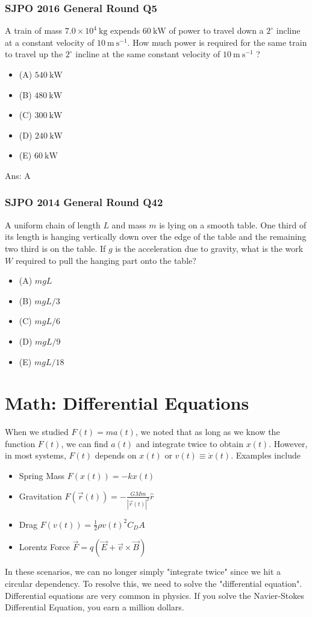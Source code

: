 \documentclass{article}
\begin{document}
\subsubsection{SJPO 2016 General Round Q5}
A train of mass $7.0 \times 10^4 \mathrm{~kg}$ expends $60 \mathrm{~kW}$ of power to travel down a $2^{\circ}$ incline at a constant velocity of $10 \mathrm{~m} \mathrm{~s}^{-1}$. How much power is required for the same train to travel up the $2^{\circ}$ incline at the same constant velocity of $10 \mathrm{~m} \mathrm{~s}^{-1}$ ?
\begin{itemize}
\item[] (A) $540 \mathrm{~kW}$
\item[] (B) $480 \mathrm{~kW}$
\item[] (C) $300 \mathrm{~kW}$
\item[] (D) $240 \mathrm{~kW}$
\item[] (E) $60 \mathrm{~kW}$
\end{itemize}
Ans:  \ifpaper A \fi

\subsubsection{SJPO 2014 General Round Q42}
A uniform chain of length $L$ and mass $m$ is lying on a smooth table. One third of its length is hanging vertically down over the edge of the table and the remaining two third is on the table. If $g$ is the acceleration due to gravity, what is the work $W$ required to pull the hanging part onto the table?
\begin{itemize}
\item[] (A) $m g L$
\item[] (B) $m g L / 3$
\item[] (C) $m g L / 6$
\item[] (D) $m g L / 9$
\item[] (E) $m g L / 18$
\end{itemize}

\section{Math: Differential Equations}
When we studied $F(t)=ma(t)$, we noted that as long as we know the function $F(t)$, we can find $a(t)$ and integrate twice to obtain $x(t)$. However, in most systems, $F(t)$ depends on $x(t)$ or $v(t) \equiv \dot{x}(t)$. Examples include 
\begin{itemize}
    \item Spring Mass $F(x(t)) = -kx(t)$
    \item Gravitation $F(\vec{r}(t)) = -\frac{GMm}{|\vec{r}(t)|^2} \hat{r}$
    \item Drag $F(v(t)) = \frac{1}{2} \rho v(t)^2 C_D A$
    \item Lorentz Force $\vec{F} = q(\vec{E} + \vec{v} \times \vec{B})$
\end{itemize}
In these scenarios, we can no longer simply "integrate twice" since we hit a circular dependency. To resolve this, we need to solve the "differential equation". Differential equations are very common in physics. If you solve the Navier-Stokes Differential Equation, you earn a million dollars.
\end{document}
